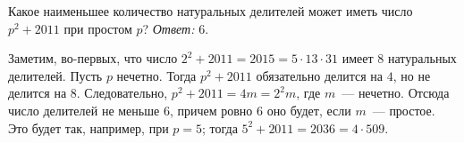 \problem
Какое наименьшее количество натуральных делителей может иметь число
$p^2 + 2011$ при простом $p$?
\solution
\emph{Ответ:} $6$.
\par
Заметим, во-первых, что число
$2^2 + 2011 = 2015 = 5 \cdot 13 \cdot 31$
имеет $8$ натуральных делителей.
Пусть $p$ нечетно.
Тогда $p^2 + 2011$ обязательно делится на $4$, но не делится на $8$.
Следовательно, $p^2 + 2011 = 4 m = 2^2 m$, где $m$~--- нечетно.
Отсюда число делителей не меньше $6$, причем ровно $6$ оно будет, если
$m$~--- простое.
Это будет так, например, при $p = 5$; тогда $5^2 + 2011 = 2036 = 4 \cdot 509$.
\endproblem
